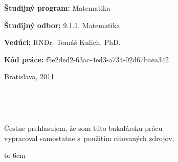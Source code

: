 \documentclass[a4paper,12pt]{article}
\def\mfkod{f5e2ded2-63ac-4ed3-a734-02d67baea342}
\def\mfadvisor{RNDr. Tomáš Kulich, PhD.}
\def\mfplacedate{Bratislava, 2011}
\def\mfprogram{Matematika}
\def\mfodbor{9.1.1. Matematika}
\begin{document}
{\bf Študijný program:} \mfprogram

{\bf Študijný odbor:} \mfodbor

{\bf Vedúci:} \mfadvisor

{\bf Kód práce:} \mfkod

\bigskip
\hfill\mfplacedate
\eject %


{~}\vspace{12cm}
\noindent
\begin{minipage}{0.25\textwidth}~\end{minipage}
\begin{minipage}{0.73\textwidth}
Čestne prehlasujem, že som túto bakalársku prácu \\ vypracoval samostatne
s~použitím citovaných zdrojov.

\bigskip\bigskip

\hfill\hbox to 6cm{\dotfill}
\end{minipage}
\vfill\eject %

\begin{abstract}

\end{abstract}
\newpage
\tableofcontents
\newpage

\newpage

\newpage
\pagestyle{headings}

\newpage

\newpage

\newpage

\newpage

\newpage
\appendix

\newpage

\newpage

\end{document}
